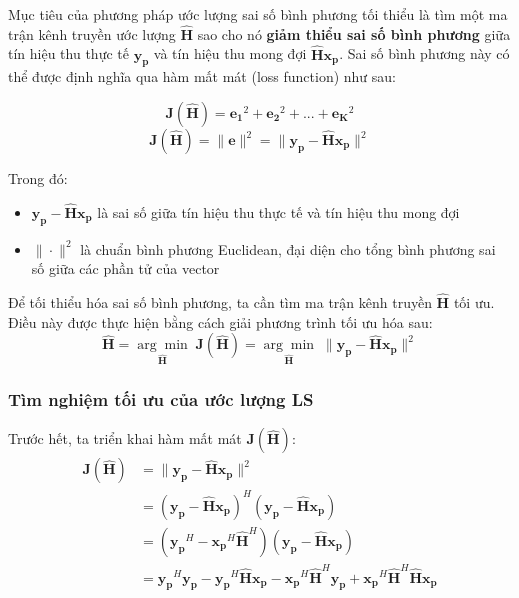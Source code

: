 Mục tiêu của phương pháp ước lượng sai số bình phương tối thiểu là tìm một ma trận kênh truyền ước lượng \( \hat{\bm{H}} \) 
sao cho nó \textbf{giảm thiểu sai số bình phương} giữa tín hiệu thu thực tế \( \bm{y_p} \) và tín hiệu thu mong đợi \( \bm{\hat{H}} \bm{x_p} \). 
Sai số bình phương này có thể được định nghĩa qua hàm mất mát (loss function) như sau:

\[
\bm{J(\hat{H})} = \bm{e_1}^2 + \bm{e_2}^2 + ... + \bm{e_K}^2
\]
% 
\begin{equation}
    \bm{J(\hat{H})} = \| \bm{e} \|^2 = \| \bm{y_p} - \bm{\hat{H}}\bm{x_p} \|^2
\end{equation}

Trong đó:
\begin{itemize}
    \item \( \bm{y_p} - \bm{\hat{H}}\bm{x_p} \) là sai số giữa tín hiệu thu thực tế và tín hiệu thu mong đợi
    \item \( \|\cdot\|^2 \) là chuẩn bình phương Euclidean, đại diện cho tổng bình phương sai số giữa các phần tử của vector
\end{itemize}

Để tối thiểu hóa sai số bình phương, ta cần tìm ma trận kênh truyền \( \hat{\mathbf{H}} \) tối ưu. Điều này được thực hiện bằng cách giải phương trình tối ưu hóa sau:
%
\begin{equation}
    \bm{\hat{H}} 
    = \underset{\bm{\hat{H}}}{\arg \min} \; \bm{J(\hat{H})}
    = \underset{\bm{\hat{H}}}{\arg \min} \; \|\bm{y_p} - \bm{\hat{H}}\bm{x_p}\|^2
\end{equation}

\subsubsection{Tìm nghiệm tối ưu của ước lượng LS}

Trước hết, ta triển khai hàm mất mát \( \bm{J(\hat{H})} \): 
% 
\begin{align*}
    \bm{J(\hat{H})} 
    &= \| \bm{y_p} - \bm{\hat{H}}\bm{x_p} \|^2 \\
    &= (\bm{y_p} - \bm{\hat{H}}\bm{x_p})^H (\bm{y_p} - \bm{\hat{H}}\bm{x_p}) \\
    &= (\bm{y_p}^H - \bm{x_p}^H\bm{\hat{H}}^H) (\bm{y_p} - \bm{\hat{H}}\bm{x_p}) \\
    &= \bm{y_p}^H\bm{y_p} - \bm{y_p}^H\bm{\hat{H}}\bm{x_p} - \bm{x_p}^H\bm{\hat{H}}^H\bm{y_p} + \bm{x_p}^H\bm{\hat{H}}^H\bm{\hat{H}}\bm{x_p}
\end{align*}

